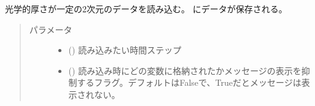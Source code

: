 \documentclass[letterpaper,10pt,dvipdfmx,report]{sphinxmanual}
\begin{document}
\begin{fulllineitems}
\label{\detokenize{io:R2D2.R2D2_data.read_qq_tau}}
光学的厚さが一定の2次元のデータを読み込む。{\hyperref[\detokenize{io:R2D2.R2D2_data.qt}]{}} にデータが保存される。
\begin{quote}\begin{description}
\item[{パラメータ}] \leavevmode\begin{itemize}
\item {} 
 () \sphinxhyphen{}\sphinxhyphen{} 読み込みたい時間ステップ

\item {} 
 () \sphinxhyphen{}\sphinxhyphen{} 読み込み時にどの変数に格納されたかメッセージの表示を抑制するフラグ。デフォルトはFalseで、Trueだとメッセージは表示されない。

\end{itemize}

\end{description}\end{quote}

\end{fulllineitems}

\end{document}
